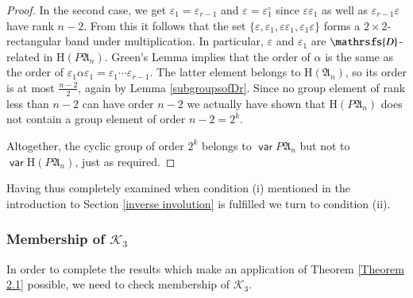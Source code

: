 \documentclass[preprint,1p,times]{elsarticle}
\DeclareMathOperator{\var}{\mathsf{var}}
\numberwithin{equation}{section}
\theoremstyle{remark}
\def\Dc{\mathrsfs{D}}
\def\ep{\varepsilon}
\def\H{\mathrm H}
\def\A{\mathfrak{A}}
\begin{document}
\begin{proof}
In the second case, we get $\ep_1=\ep_{r-1}$ and $\ep=\ep_1^\circ$ since $\ep\ep_1$ as well as $\ep_{r-1}\ep$ have
rank $n-2$. From this it follows that the set $\{\ep,\ep_1,\ep\ep_1,\ep_1\ep\}$ forms a $2\times 2$-rectangular band
under multiplication. In particular, $\ep$ and $\ep_1$ are $\Dc$-related in $\H (P\A_n)$. Green's Lemma implies that
the order of $\alpha$ is the same as the order of $\ep_1\alpha\ep_1=\ep_1\cdots\ep_{r-1}$. The latter element belongs
to $\H(\A_n)$, so its order is at most $\frac{n-2}2$, again by Lemma \ref{subgroupsofDr}. Since no group element
of rank less than $n-2$ can have order $n-2$ we actually have shown that $\H (P\A_n)$ does not contain a group element
of order $n-2=2^k$.

Altogether, the cyclic group of order $2^k$ belongs to $\var P\A_n$ but not to $\var\H (P\A_n)$, just as required.
\end{proof}
Having thus completely examined when condition (i) mentioned in the introduction to Section \ref{inverse involution} is
fulfilled we turn to condition (ii).

\subsubsection{Membership of $\mathcal{K}_3$}

In order to complete the results which make an application of Theorem \ref{Theorem 2.1} possible, we need to check
membership of $\mathcal{K}_3$.
\end{document}
